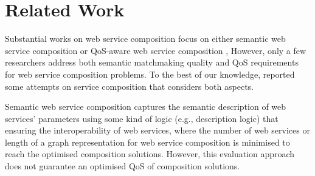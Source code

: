 \documentclass{llncs}
\begin{document}
\section{Related Work} \label{relatedWork}
Substantial works on web service composition focus on either semantic web service composition \cite{boustil2014semantic,bansal2016generalized,mier2015integrated} or QoS-aware web service composition \cite{gupta2015optimization,qi2010combining,ma2015hybrid,da2016particle,da2015graphevol,yu2013adaptive}, However, only a few researchers address both semantic matchmaking quality and QoS requirements for web service composition problems. To the best of our knowledge, \cite{fanjiang2014semantic,lecue2009optimizing,pop2009immune} reported some attempts on service composition that considers both aspects.

Semantic web service composition \cite{bansal2016generalized,boustil2014semantic,mier2015integrated} captures the semantic description of web services' parameters using some kind of logic (e.g., description logic) that ensuring the interoperability of web services, where the number of web services or length of a graph representation for web service composition is minimised to reach the optimised composition solutions. However, this evaluation approach does not guarantee an optimised QoS of composition solutions.
\end{document}
